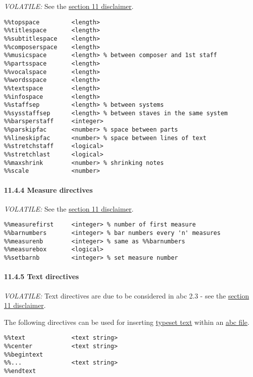 \emph{VOLATILE:} See the \protect\hyperlink{disclaimer}{section 11
disclaimer}.

\begin{verbatim}
%%topspace         <length>
%%titlespace       <length>
%%subtitlespace    <length>
%%composerspace    <length>
%%musicspace       <length> % between composer and 1st staff
%%partsspace       <length>
%%vocalspace       <length>
%%wordsspace       <length>
%%textspace        <length>
%%infospace        <length>
%%staffsep         <length> % between systems
%%sysstaffsep      <length> % between staves in the same system
%%barsperstaff     <integer>
%%parskipfac       <number> % space between parts
%%lineskipfac      <number> % space between lines of text
%%stretchstaff     <logical>
%%stretchlast      <logical>
%%maxshrink        <number> % shrinking notes
%%scale            <number>
\end{verbatim}

\hypertarget{measure_directives}{\paragraph{11.4.4 Measure
directives}\label{measure_directives}}

\emph{VOLATILE:} See the \protect\hyperlink{disclaimer}{section 11
disclaimer}.

\begin{verbatim}
%%measurefirst     <integer> % number of first measure
%%barnumbers       <integer> % bar numbers every 'n' measures
%%measurenb        <integer> % same as %%barnumbers
%%measurebox       <logical>
%%setbarnb         <integer> % set measure number
\end{verbatim}

\hypertarget{text_directives}{\paragraph{11.4.5 Text
directives}\label{text_directives}}

\emph{VOLATILE:} Text directives are due to be considered in abc 2.3 -
see the \protect\hyperlink{disclaimer}{section 11 disclaimer}.

The following directives can be used for inserting
\protect\hyperlink{typeset_text_definition}{typeset text} within an
\protect\hyperlink{abc_file_definition}{abc file}.

\begin{verbatim}
%%text             <text string>
%%center           <text string>
%%begintext
%%...              <text string>
%%endtext
\end{verbatim}

